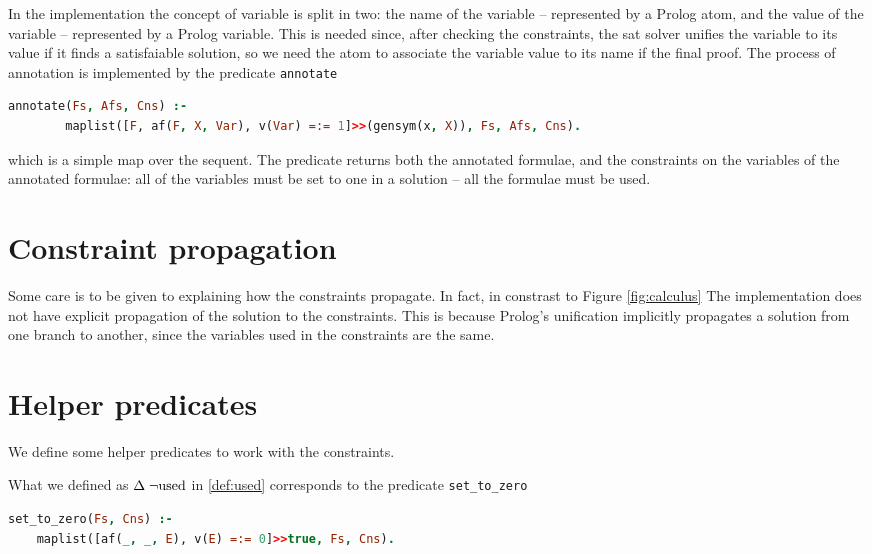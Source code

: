 \documentclass[a4paper, 12pt, tesi, english]{report}
\begin{document}
In the implementation the concept of variable is split in two: the name of the variable -- represented by a Prolog atom, and the value of the variable -- represented by a Prolog variable.
This is needed since, after checking the constraints, the sat solver unifies the variable to its value if it finds a satisfaiable solution, so we need the atom to associate the variable value to its name if the final proof.
The process of annotation is implemented by the predicate \texttt{annotate}
\begin{lstlisting}[language=prolog]
%! annotate(+[Formulae], -[AFs], -[Constraints]) is det.
annotate(Fs, Afs, Cns) :-
    	maplist([F, af(F, X, Var), v(Var) =:= 1]>>(gensym(x, X)), Fs, Afs, Cns).
\end{lstlisting}
which is a simple map over the sequent.
The predicate returns both the annotated formulae, and the constraints on the variables of the annotated formulae: all of the variables must be set to one in a solution -- all the formulae must be used.

\section{Constraint propagation}
Some care is to be given to explaining how the constraints propagate.
In fact, in constrast to Figure \ref{fig:calculus} The implementation does not have explicit propagation of the solution to the constraints.
This is because Prolog's unification implicitly propagates a solution from one branch to another, since the variables used in the constraints are the same.

\section{Helper predicates}
We define some helper predicates to work with the constraints.

What we defined as $\Delta \; \neg\text{used}$ in \ref{def:used} corresponds to the predicate \texttt{set\_to\_zero}
\begin{lstlisting}[language=prolog]
%! set_to_zero(+[AFs], -[Constr]) is det.
set_to_zero(Fs, Cns) :-
    maplist([af(_, _, E), v(E) =:= 0]>>true, Fs, Cns).
\end{lstlisting}
\end{document}
